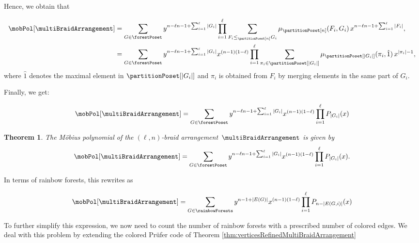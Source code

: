 \documentclass[11pt,leqno]{amsart}
\theoremstyle{definition}
\theoremstyle{plain}
\newtheorem{theorem}[definition]{Theorem}
\begin{document}
Hence, we obtain that

\begin{align*}
\mobPol[\multiBraidArrangement] &=\sum_{G \in \forestPoset} y^{n-\ell n - 1 + \sum_{i=1}^\ell |G_i|} \prod_{i=1}^{\ell} \sum_{F_i \leq_{\partitionPoset[n]} G_i } \mu_{\partitionPoset[n]}(F_i,G_i) \, x^{n-\ell n - 1 + \sum_{i=1}^\ell |F_i|}, \\
 &=\sum_{G \in \forestPoset} y^{n-\ell n - 1 + \sum_{i=1}^\ell |G_i|} x^{(n-1)(1-\ell)} \prod_{i=1}^{\ell} \sum_{\pi_i \in \partitionPoset[|G_i|]}  \mu_{\partitionPoset[|G_i|]}(\pi_i,\hat{1}) \, x^{|\pi_i|-1}, 
\end{align*}
where $\hat{1}$ denotes the maximal element in $\partitionPoset[|G_i|]$ and $\pi_i$ is obtained from $F_i$ by merging elements in the same part of $G_i$.

Finally, we get:

\begin{equation}
\mobPol[\multiBraidArrangement]=\sum_{G \in \forestPoset} y^{n-\ell n - 1 + \sum_{i=1}^\ell |G_i|} x^{(n-1)(1-\ell)} \prod_{i=1}^{\ell} P_{|G_i|}(x)
\end{equation}

\begin{theorem}
The M\"obius polynomial of the $(\ell,n)$-braid arrangement~$\multiBraidArrangement$ is given by
\[
\mobPol[\multiBraidArrangement]=\sum_{G \in \forestPoset} y^{n-\ell n - 1 + \sum_{i=1}^\ell |G_i|} x^{(n-1)(1-\ell)} \prod_{i=1}^{\ell} P_{|G_i|}(x).
\]
\end{theorem}

In terms of rainbow forests, this rewrites as

\begin{equation}
\mobPol[\multiBraidArrangement]=\sum_{G \in \rainbowForests} y^{n- 1 + |E(G)|} x^{(n-1)(1-\ell)} \prod_{i=1}^{\ell} P_{n-|E(G,i)|}(x)
\end{equation}

To further simplify this expression, we now need to count the number of rainbow forests with a prescribed number of colored edges. We deal with this problem by extending the colored Pr\"{u}fer code of Theorem \ref{thm:verticesRefinedMultiBraidArrangement}





\label{sec:biblio}
\end{document}
